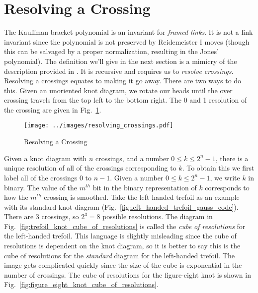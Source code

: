 \documentclass{article}
\theoremstyle{plain}
\begin{document}
    \section{Resolving a Crossing}
        The Kauffman bracket polynomial is an invariant for
        \textit{framed links}. It is not a link invariant since the polynomial
        is not preserved by Reidemeister I moves (though this can be salvaged
        by a proper normalization, resulting in the Jones' polynomial). The
        definition we'll give in the next section is a mimicry of the
        description provided in \cite{barnatan2002khovanov}. It is recursive
        and requires us to \textit{resolve crossings}. Resolving a crossings
        equates to making it go away. There are two ways to do this.
        Given an unoriented knot diagram, we rotate our heads until
        the over crossing travels from the top left to the bottom right. The
        0 and 1 resolution of the crossing are given in
        Fig.~\ref{fig:resolving_crossing}.
        \begin{figure}
            \centering
            \texttt{[image: ../images/resolving\_crossings.pdf]}
            \caption{Resolving a Crossing}
            \label{fig:resolving_crossing}
        \end{figure}
        Given a knot diagram with $n$ crossings, and a number
        $0\leq{k}\leq{2}^{n}-1$, there is a unique resolution of all of the
        crossings corresponding to $k$. To obtain this we first label all of
        the crossings $0$ to $n-1$. Given a number $0\leq{k}\leq{2}^{n}-1$,
        we write $k$ in binary. The value of the $m^{th}$ bit in the
        binary representation of $k$ corresponds to how the $m^{th}$ crossing
        is smoothed. Take the left handed trefoil as an example with its
        standard knot diagram (Fig.~\ref{fig:left_handed_trefoil_gauss_code}).
        There are 3 crossings, so $2^{3}=8$ possible resolutions. The diagram
        in Fig.~\ref{fig:trefoil_knot_cube_of_resolutions} is called the
        \textit{cube of resolutions} for the left-handed
        trefoil. This language is slightly misleading since the cube of
        resolutions is dependent on the knot diagram, so it is better to say
        this is the cube of resolutions for the \textit{standard} diagram for
        the left-handed trefoil. The image gets complicated quickly since the
        size of the cube is exponential in the number of crossings. The cube of
        resolutions for the figure-eight knot is shown in
        Fig.~\ref{fig:figure_eight_knot_cube_of_resolutions}.
\end{document}
